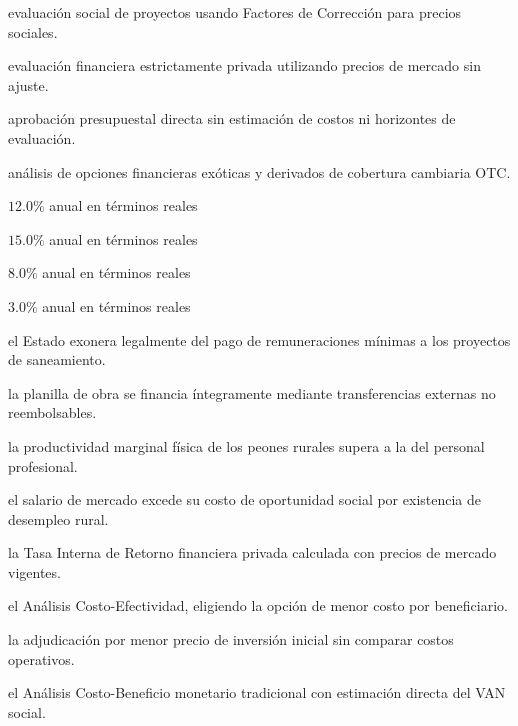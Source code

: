 \begin{opts}
    \item evaluación social de proyectos usando Factores de Corrección para precios sociales.
    \item evaluación financiera estrictamente privada utilizando precios de mercado sin ajuste.
    \item aprobación presupuestal directa sin estimación de costos ni horizontes de evaluación.
    \item análisis de opciones financieras exóticas y derivados de cobertura cambiaria OTC.
\end{opts}

\begin{opts}
    \item $12.0\%$ anual en términos reales
    \item $15.0\%$ anual en términos reales
    \item $8.0\%$ anual en términos reales
    \item $3.0\%$ anual en términos reales
\end{opts}

\begin{opts}
    \item el Estado exonera legalmente del pago de remuneraciones mínimas a los proyectos de saneamiento.
    \item la planilla de obra se financia íntegramente mediante transferencias externas no reembolsables.
    \item la productividad marginal física de los peones rurales supera a la del personal profesional.
    \item el salario de mercado excede su costo de oportunidad social por existencia de desempleo rural.
\end{opts}

\begin{opts}
    \item la Tasa Interna de Retorno financiera privada calculada con precios de mercado vigentes.
    \item el Análisis Costo-Efectividad, eligiendo la opción de menor costo por beneficiario.
    \item la adjudicación por menor precio de inversión inicial sin comparar costos operativos.
    \item el Análisis Costo-Beneficio monetario tradicional con estimación directa del VAN social.
\end{opts}

